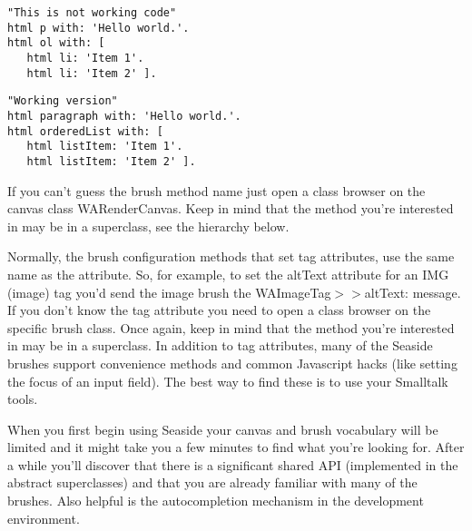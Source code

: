 \documentclass[a4paper,10pt,twoside]{book}
\newcommand{\ct}[1]{{\small\ttfamily\textup{#1}}}
\begin{document}
\begin{lstlisting}
"This is not working code"
html p with: 'Hello world.'.
html ol with: [
   html li: 'Item 1'.
   html li: 'Item 2' ].
\end{lstlisting}

\begin{lstlisting}
"Working version"
html paragraph with: 'Hello world.'.
html orderedList with: [
   html listItem: 'Item 1'.
   html listItem: 'Item 2' ].
\end{lstlisting}

If you can't guess the brush method name just open a class browser on the canvas class \ct{WARenderCanvas}. Keep in mind that the method you're interested in may be in a superclass, see the hierarchy below.

Normally, the brush configuration methods that set tag attributes, use the same name as the attribute. So, for example, to set the \ct{altText} attribute for an \ct{IMG} (image) tag you'd send the \ct{image} brush the \ct{WAImageTag$>$$>$altText:} message. If you don't know the tag attribute you need to open a class browser on the specific brush class. Once again, keep in mind that the method you're interested in may be in a superclass. In addition to tag attributes, many of the Seaside brushes support convenience methods and common Javascript hacks (like setting the focus of an input field). The best way to find these is to use your Smalltalk tools.

When you first begin using Seaside your canvas and brush vocabulary will be limited and it might take you a few minutes to find what you're looking for. After a while you'll discover that there is a significant shared API (implemented in the abstract superclasses) and that you are already familiar with many of the brushes. Also helpful is the autocompletion mechanism in the development environment.
\end{document}

